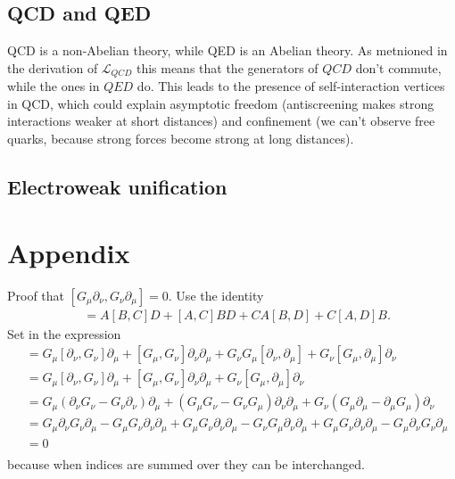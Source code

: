 \documentclass[11pt]{article}
\begin{document}
\begin{multicols}{2}
\subsection*{QCD and QED}
\begin{flushleft}
QCD is a non-Abelian theory, while QED is an Abelian theory. As metnioned in the derivation of $\mathcal{L}_{QCD}$ this means that the generators of $QCD$ don't commute, while the ones in $QED$ do. This leads to the presence of self-interaction vertices in QCD, which could explain asymptotic freedom (antiscreening makes strong interactions weaker at short distances) and confinement (we can't observe free quarks, because strong forces become strong at long distances).
\end{flushleft}


\subsection*{Electroweak unification}
\begin{flushleft}

\end{flushleft}


\end{multicols}

\pagebreak

\section*{Appendix}
\begin{flushleft}
Proof that $[G_{\mu} \partial_{\nu}, G_{\nu} \partial_{\mu}]=0$. Use the identity
\begin{align}
[AB, CD] &= A[B,C]D + [A,C]BD + CA[B,D] + C[A,D]B.
\end{align}
Set in the expression
\begin{align*}
[G_{\mu} \partial_{\nu}, G_{\nu} \partial_{\mu}] &= G_{\mu} [\partial_{\nu}, G_{\nu}] \partial_{\mu} + [G_{\mu}, G_{\nu}] \partial_{\nu}  \partial_{\mu} + G_{\nu} G_{\mu}  [\partial_{\nu}  ,\partial_{\mu}] + G_{\nu}[G_{\mu}, \partial_{\mu}]  \partial_{\nu}\\
&= G_{\mu} [\partial_{\nu}, G_{\nu}] \partial_{\mu} + [G_{\mu}, G_{\nu}] \partial_{\nu}  \partial_{\mu}  + G_{\nu}[G_{\mu}, \partial_{\mu}]  \partial_{\nu} \\
&= G_{\mu} (\partial_{\nu}G_{\nu}-G_{\nu}\partial_{\nu} ) \partial_{\mu} + (G_{\mu} G_{\nu}-G_{\nu} G_{\mu}) \partial_{\nu}  \partial_{\mu}  + G_{\nu}(G_{\mu}\partial_{\mu}-\partial_{\mu}G_{\mu}) \partial_{\nu}\\
&= G_{\mu} \partial_{\nu}G_{\nu} \partial_{\mu}-G_{\mu}G_{\nu}\partial_{\nu}  \partial_{\mu} + G_{\mu} G_{\nu}\partial_{\nu}  \partial_{\mu}-G_{\nu} G_{\mu} \partial_{\nu}  \partial_{\mu}  + G_{\mu}G_{\nu}\partial_{\nu}\partial_{\mu}-G_{\mu}\partial_{\nu}G_{\nu} \partial_{\mu}\\
&= 0\\
\end{align*}
because when indices are summed over they can be interchanged.
\end{flushleft}
\end{document}
